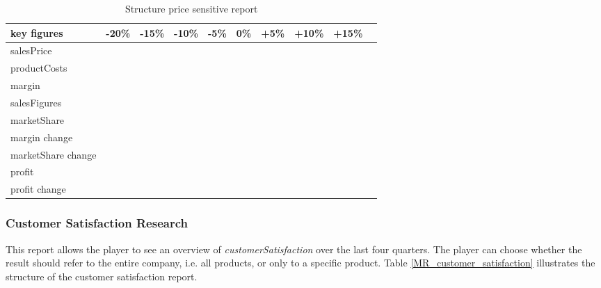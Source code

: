 \begin{table}[ht]
\centering
\begin{tabular}{|l|r|r|r|r|r|r|r|r|r|}
\hline
\textbf{key figures} & \textbf{-20\%} & \textbf{-15\%} & \textbf{-10\%} & \textbf{-5\%}  & \textbf{0\%}   & \textbf{+5\%}  & \textbf{+10\%} & \textbf{+15\%}   \\ \hline
salesPrice            &       &       &       &       &       &       &       &         \\
productCosts           &       &       &       &       &       &       &       &         \\
margin                  &       &       &       &       &       &       &       &         \\
salesFigures            &       &       &       &       &       &       &       &         \\
marketShare            &       &       &       &       &       &       &       &         \\
margin change           &       &       &       &       &       &       &       &         \\
marketShare change     &       &       &       &       &       &       &       &         \\
profit             &       &       &       &       &       &       &       &         \\
profit change             &       &       &       &       &       &       &       &         \\
\hline
\end{tabular}
\caption{Structure price sensitive report}
\label{MR_price_sensitive}
\end{table}

\subsubsection{Customer Satisfaction Research}
This report allows the player to see an overview of \textit{customerSatisfaction} over the last four quarters. The player can choose whether the result should refer to the entire company, i.e. all products, or only to a specific product. Table \ref{MR_customer_satisfaction} illustrates the structure of the customer satisfaction report. \\


